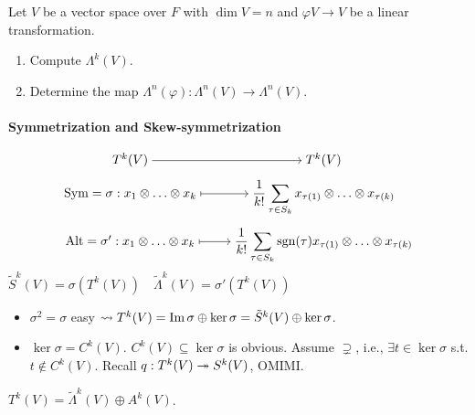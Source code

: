 \begin{exercise}
  Let $V$ be a vector space over $F$ with $\dim V = n$ and $\varphi V\to V$
  be a linear transformation.
  \begin{enumerate}[(1)]
    \item Compute $\Lambda^k(V)$.
    \item Determine the map $\Lambda^n(\varphi): \Lambda^n(V)\to \Lambda^n(V)$.
  \end{enumerate}
\end{exercise}

\paragraph{Symmetrization and Skew-symmetrization}
\[
  \begin{tikzcd}[cramped, row sep=tiny]
    T^k(V) \arrow[r] & T^k(V) \\
    \Sym = \sigma: x_1\Ot \dots \Ot x_k \arrow[r, mapsto]
    & \displaystyle \frac{1}{k!}\sum_{\tau \in S_k}
    x_{\tau(1)}\Ot \dots \Ot x_{\tau(k)} \\
    \Alt = \sigma': x_1\Ot \dots \Ot x_k \arrow[r, mapsto]
    & \displaystyle \frac{1}{k!}\sum_{\tau \in S_k} \sgn(\tau)
    x_{\tau(1)}\Ot \dots \Ot x_{\tau(k)}
  \end{tikzcd}
\]
$\tilde{S}^k(V) = \sigma(T^k(V)) \quad \tilde{\Lambda}^k(V) = \sigma'(T^k(V))$

\begin{itemize}
  \item $\sigma^2 = \sigma$ easy $\leadsto T^k(V) = \operatorname{Im} \sigma \oplus
    \ker \sigma = \tilde{S}^k(V) \oplus \ker \sigma$.
  \item $\ker \sigma = C^k(V)$.
    $C^k(V) \subseteq \ker \sigma$ is obvious.
    Assume $\supsetneq$, i.e., $\exists t \in \ker \sigma$ s.t.
    $t \not\in C^k(V)$.
    Recall $q: T^k(V) \twoheadrightarrow S^k(V)$, OMIMI.
\end{itemize}

\begin{exercise}
  $T^k(V) = \tilde{\Lambda}^k(V) \oplus A^k(V)$.
\end{exercise}
